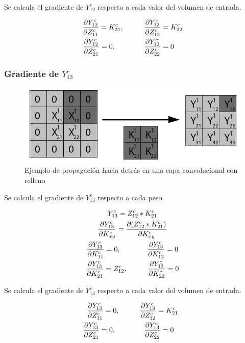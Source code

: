 Se calcula el gradiente de $Y^c_{12}$ respecto a cada valor del volumen de entrada.

\begin{gather}
	\frac{\partial Y^c_{12}}{\partial Z^c_{11}} = K^c_{21}, \hspace{10mm} \frac{\partial Y^c_{12}}{\partial Z^c_{12}} = K^c_{22}\\
	\frac{\partial Y^c_{12}}{\partial Z^c_{21}} = 0, \hspace{14mm} \frac{\partial Y^c_{12}}{\partial Z^c_{22}} = 0 \hspace{4mm}
\end{gather}

\subsubsection{Gradiente de $Y^c_{13}$}

\begin{figure}[H]
	\centering
	\includegraphics[width=0.8\linewidth]{imagenes/conv_back_padding_3.jpg} 
	\caption{Ejemplo de propagación hacia detrás en una capa convolucional con relleno}
\end{figure}

Se calcula el gradiente de $Y^c_{13}$ respecto a cada peso.

\begin{gather}
	Y^c_{13} = Z^c_{12} * K^c_{21} \\
	\frac{\partial Y^c_{13}}{\partial K^c_{xy}} = \frac{\partial (Z^c_{12} * K^c_{21})}{\partial K^c_{xy}} \\
	\frac{\partial Y^c_{13}}{\partial K^c_{11}} = 0, \hspace{13mm} \frac{\partial Y^c_{13}}{\partial K^c_{12}} = 0 \\
	\frac{\partial Y^c_{13}}{\partial K^c_{21}} = Z^c_{12}, \hspace{10mm} \frac{\partial Y^c_{13}}{\partial K^c_{22}} = 0
\end{gather}

Se calcula el gradiente de $Y^c_{13}$ respecto a cada valor del volumen de entrada.

\begin{gather}
	\frac{\partial Y^c_{13}}{\partial Z^c_{11}} = 0, \hspace{10mm} \frac{\partial Y^c_{13}}{\partial Z^c_{12}} = K^c_{21}\\
	\frac{\partial Y^c_{13}}{\partial Z^c_{21}} = 0, \hspace{14mm} \frac{\partial Y^c_{13}}{\partial Z^c_{22}} = 0 \hspace{4mm}
\end{gather}


